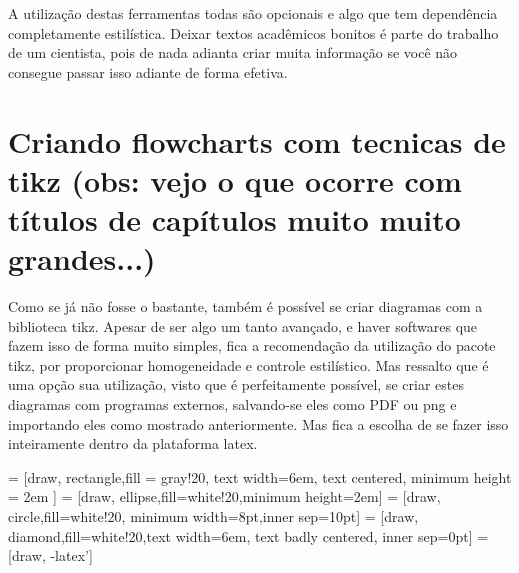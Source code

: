 A utilização destas ferramentas todas são opcionais e algo que tem dependência completamente estilística. Deixar textos acadêmicos bonitos é parte do trabalho de um cientista, pois de nada adianta criar muita informação se você não consegue passar isso adiante de forma efetiva. 

\section{Criando flowcharts com tecnicas de tikz (obs: vejo o que ocorre com títulos de capítulos muito muito grandes...)}

Como se já não fosse o bastante, também é possível se criar diagramas com a biblioteca tikz. Apesar de ser algo um tanto avançado, e haver softwares que fazem isso de forma muito simples, fica a recomendação da utilização do pacote tikz, por proporcionar homogeneidade e controle estilístico. Mas ressalto que é uma opção sua utilização, visto que é perfeitamente possível, se criar estes diagramas com programas externos, salvando-se eles como PDF ou png e importando eles como mostrado anteriormente. Mas fica a escolha de se fazer isso inteiramente dentro da plataforma latex.


 = [draw, rectangle,fill = gray!20, text width=6em, text centered, minimum height = 2em ]
 = [draw, ellipse,fill=white!20,minimum height=2em]
 = [draw, circle,fill=white!20, minimum width=8pt,inner sep=10pt]
 = [draw, diamond,fill=white!20,text width=6em, text badly centered, inner sep=0pt]
 = [draw, -latex']

